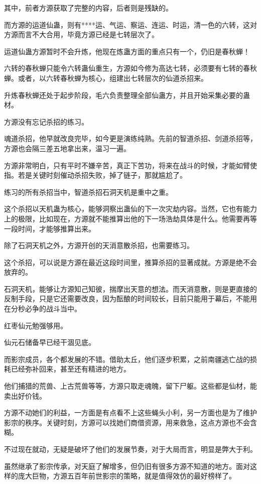 \begin{this_body}
其中，前者方源获取了完整的内容，后者则是残缺的。

而方源的运道仙蛊，则有****运、气运、察运、连运、时运，清一色的六转，这对方源而言不大合用，毕竟方源已经是七转层次了。

运道仙蛊方源暂时不会升炼，他现在炼蛊方面的重点只有一个，仍旧是春秋蝉！

六转的春秋蝉只能令六转蛊仙重生，方源如今修为高达七转，必须要有七转的春秋蝉。或者，以六转春秋蝉为核心，组建出七转层次的仙道杀招来。

升炼春秋蝉还处于起步阶段，毛六负责整理全部仙蛊方，并且开始采集必要的蛊材。

方源没有忘记杀招的练习。

魂道杀招，他早就改良完毕，如今更是演练纯熟。先前的智道杀招、剑道杀招等，方源也会隔三差五地拿出来，温习一遍。

方源非常明白，只有平时不嫌辛苦，真正下苦功，将来在战斗的时候，才能如臂使指。若是关键时刻催动杀招失败，掉了链子，那就尴尬了。

练习的所有杀招当中，智道杀招石洞天机是重中之重。

这个杀招以天机蛊为核心，能够洞察出蛊仙的下一次灾劫内容。当然，它也有能力上的极限，比如现在，方源就不能推算出他的下一场浩劫具体是什么。他需要再等一段时间，才能够推算出来。

除了石洞天机之外，方源开创的天消意散杀招，也需要练习。

这个杀招，可以说是方源在最近这段时间里，推算杀招的显著成就。方源是绝不会放弃的。

石洞天机，能够让方源知己知彼，揣摩出天意的想法。而天消意散，则是更直接的反制手段，只是它还需要改良，因为酝酿的时间较长，目前只能用于幕后，不能用在分秒必争的战斗当中。

红枣仙元勉强够用。

仙元石储备早已经干涸见底。

而影宗成员，各个都发展的不错。借助太丘，他们逐步积累，之前南疆逃亡战的损耗已经弥补回来，甚至还有精进的地方。

他们捕猎的荒兽、上古荒兽等等，方源只取走魂魄，留下尸躯。这些都是仙材，能卖出好价钱。

方源不动她们的利益，一方面是有点看不上这些蝇头小利，另一方面也是为了维护影宗的秩序。关键时刻，方源可以找她们商借资源，用来救急，这点方源也不会含糊。

不过现在就动，无疑是破坏了他们的发展节奏，对于大局而言，明显是弊大于利。

虽然继承了影宗传承，对天庭了解增多，但仍旧有很多方源不知道的地方。面对这样的庞大巨物，方源五百年前世影宗的策略，就是值得效仿的最好榜样了。


\end{this_body}
